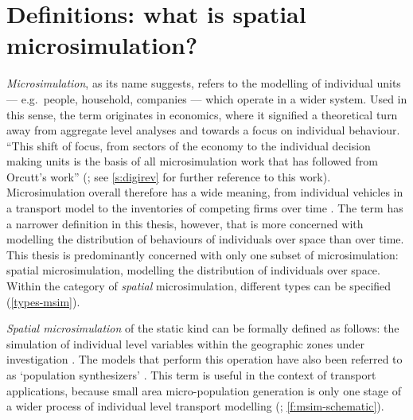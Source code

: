 \documentclass[a4paper, 11pt, twoside]{Thesis}
\begin{document}
\section{Definitions: what is spatial microsimulation?}
\label{s:defs}
\emph{Microsimulation}, as its name suggests, refers to the modelling of
individual units --- e.g.~people, household, companies --- which operate in a
wider system. Used in this sense, the term originates in economics, where it
signified a theoretical turn away from aggregate level analyses and towards a
focus on individual behaviour. ``This shift of focus, from sectors of the
economy to the individual decision making units is the basis of all
microsimulation work that has followed from Orcutt's work''
(\citealp[p.~145]{Holm1987}; see \cref{s:digirev} for further reference to
this work). Microsimulation overall therefore has a wide meaning, from
individual vehicles in a transport model \citep{Liu2006, Ferguson2012}
to the inventories of
competing firms over time \citep{Bergmann1990a}.
The term has a narrower definition in this
thesis, however, that is more concerned with modelling the distribution of
behaviours of individuals over space than over time. This thesis is predominantly
concerned with only one subset of microsimulation: spatial
microsimulation, modelling the distribution of individuals over
space. Within the category of \emph{spatial} microsimulation, different types
can be specified (\cref{types-msim}).

\emph{Spatial microsimulation} of the static kind can be formally
defined as
follows: the simulation of individual level variables within the geographic
zones under investigation \citep{ballas2003microsimulation-30-years, Ballas2007simb}.
The models that perform this operation have also
been referred to as `population synthesizers' \citep{Mohammadian2010}. This
term is useful in the context of transport applications, because small area
micro-population generation is only one stage of a wider process of
individual level transport modelling (\citealp{Pritchard2012}; \cref{f:msim-schematic}).
\end{document}
